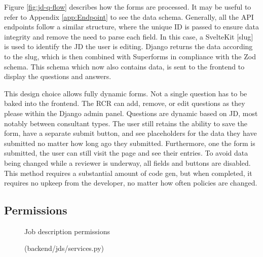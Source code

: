 Figure \ref{fig:jd-q-flow} describes how the forms are processed. It may be useful to refer to Appendix \ref{app:Endpoint} to see the data schema. Generally, all the API endpoints follow a similar structure, where the unique ID is passed to ensure data integrity and remove the need to parse each field. In this case, a SvelteKit $[$slug$]$ is used to identify the JD the user is editing. Django returns the data according to the slug, which is then combined with Superforms in compliance with the Zod schema. This schema which now also contains data, is sent to the frontend to display the questions and answers. 

This design choice allows fully dynamic forms. Not a single question has to be baked into the frontend. The RCR can add, remove, or edit questions as they please within the Django admin panel. Questions are dynamic based on JD, most notably between consultant types. The user still retains the ability to save the form, have a separate submit button, and see placeholders for the data they have submitted no matter how long ago they submitted. Furthermore, one the form is submitted, the user can still visit the page and see their entries. To avoid data being changed while a reviewer is underway, all fields and buttons are disabled. This method requires a substantial amount of code gen, but when completed, it requires no upkeep from the developer, no matter how often policies are changed.

\subsection{Permissions}
\begin{figure}[h]
\centering
{}
\vspace{-5pt}
\caption{Job description permissions}
\vspace{-10pt}
\caption*{(backend/jds/services.py)}
\label{fig:jd-perms}
\vspace{-5pt}
\end{figure}

